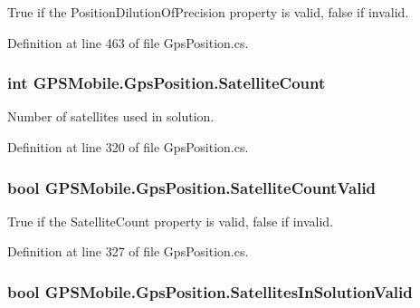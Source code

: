 True if the PositionDilutionOfPrecision property is valid, false if invalid. 

Definition at line 463 of file GpsPosition.cs.\hypertarget{class_g_p_s_mobile_1_1_gps_position_a2b6d5feb969ab18a4a739250c62ffe25}{
\subsubsection[{SatelliteCount}]{\setlength{\rightskip}{0pt plus 5cm}int GPSMobile.GpsPosition.SatelliteCount}}
\label{class_g_p_s_mobile_1_1_gps_position_a2b6d5feb969ab18a4a739250c62ffe25}


Number of satellites used in solution. 

Definition at line 320 of file GpsPosition.cs.\hypertarget{class_g_p_s_mobile_1_1_gps_position_af911c9eb00e8dab5c549e53748d3389a}{
\subsubsection[{SatelliteCountValid}]{\setlength{\rightskip}{0pt plus 5cm}bool GPSMobile.GpsPosition.SatelliteCountValid}}
\label{class_g_p_s_mobile_1_1_gps_position_af911c9eb00e8dab5c549e53748d3389a}


True if the SatelliteCount property is valid, false if invalid. 

Definition at line 327 of file GpsPosition.cs.\hypertarget{class_g_p_s_mobile_1_1_gps_position_aba3bb10f98a06a82ac9504e01f9aa4c5}{
\subsubsection[{SatellitesInSolutionValid}]{\setlength{\rightskip}{0pt plus 5cm}bool GPSMobile.GpsPosition.SatellitesInSolutionValid}}
\label{class_g_p_s_mobile_1_1_gps_position_aba3bb10f98a06a82ac9504e01f9aa4c5}


